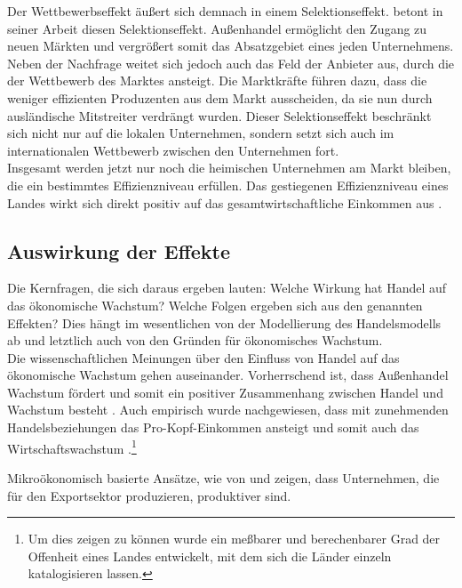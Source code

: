 Der Wettbewerbseffekt äu{\ss}ert sich demnach in einem Selektionseffekt. \citet{Melitz.2003} betont in seiner Arbeit diesen Selektionseffekt. Au{\ss}enhandel erm{\"o}glicht den Zugang zu neuen M{\"a}rkten und vergr{\"o}{\ss}ert somit das Absatzgebiet eines jeden Unternehmens. Neben der Nachfrage weitet sich jedoch auch das Feld der Anbieter aus, durch die der Wettbewerb des Marktes ansteigt. Die Marktkr{\"a}fte f{\"u}hren dazu, dass die weniger effizienten Produzenten aus dem Markt ausscheiden, da sie nun durch ausl{\"a}ndische Mitstreiter verdr{\"a}ngt wurden. Dieser Selektionseffekt beschränkt sich nicht nur auf die lokalen Unternehmen, sondern setzt sich auch im internationalen Wettbewerb zwischen den Unternehmen fort.\\Insgesamt werden jetzt nur noch die heimischen Unternehmen am Markt bleiben, die ein bestimmtes Effizienzniveau erf{\"u}llen. Das gestiegenen Effizienzniveau eines Landes wirkt sich direkt positiv auf das gesamtwirtschaftliche Einkommen aus \citep[Kapitel 15]{Aghion.2015}.


\subsection{Auswirkung der Effekte}
Die Kernfragen, die sich daraus ergeben lauten:  Welche Wirkung hat Handel auf das {\"o}konomische Wachstum? Welche Folgen ergeben sich aus den genannten Effekten? Dies h{\"a}ngt im wesentlichen von der Modellierung des Handelsmodells ab und letztlich auch von den Gr{\"u}nden f{\"u}r {\"o}konomisches Wachstum.\\
Die wissenschaftlichen Meinungen {\"u}ber den Einfluss von Handel auf das {\"o}konomische Wachstum gehen auseinander. Vorherrschend ist, dass Au{\ss}enhandel Wachstum f{\"o}rdert und somit ein positiver Zusammenhang zwischen Handel und Wachstum besteht \citep{Dollar.1992,Sachs.1995}. Auch empirisch wurde nachgewiesen, dass mit zunehmenden Handelsbeziehungen das Pro-Kopf-Einkommen ansteigt und somit auch das Wirtschaftswachstum \citep{Frankel.1999}.\footnote{Um dies zeigen zu können wurde ein me{\ss}barer und berechenbarer Grad der Offenheit eines Landes entwickelt, mit dem sich die L{\"a}nder einzeln katalogisieren lassen.}\newline


Mikro{\"o}konomisch basierte Ans{\"a}tze, wie von \citet{Bernard.2003} und \citet{Bernard.2004} zeigen, dass Unternehmen, die f{\"u}r den Exportsektor produzieren, produktiver sind. \\


